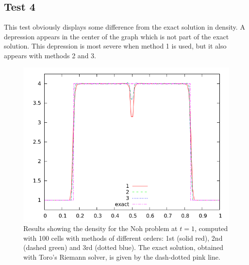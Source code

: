 \documentclass[10pt]{article}
\begin{document}
\clearpage

\subsection{Test 4}

This test obviously displays some difference from the exact solution in density. A depression appears in the center of the graph which is not part of the exact solution. This depression is most severe when method 1 is used, but it also appears with methods 2 and 3. 

\begin{figure}[h]
  \begin{center}
     \includegraphics[width=.78\textwidth]{den_T4.png}	
  \end{center}
  \caption{Results showing the density for the Noh problem at $t=1$, computed with 100 cells with methods of different orders: 1st (solid red), 2nd (dashed green) and 3rd (dotted blue). The exact solution, obtained with Toro's Riemann solver, is given by the dash-dotted pink line.}
  \label{fig:den_T4}
\end{figure}
\end{document}
